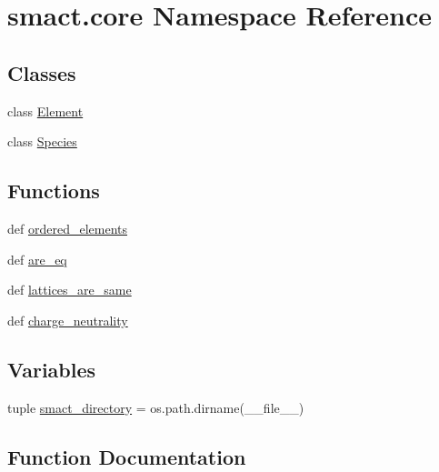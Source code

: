 \hypertarget{namespacesmact_1_1core}{}\section{smact.\+core Namespace Reference}
\label{namespacesmact_1_1core}
\subsection*{Classes}
\begin{DoxyCompactItemize}
\item 
class \hyperlink{classsmact_1_1core_1_1_element}{Element}
\item 
class \hyperlink{classsmact_1_1core_1_1_species}{Species}
\end{DoxyCompactItemize}
\subsection*{Functions}
\begin{DoxyCompactItemize}
\item 
def \hyperlink{namespacesmact_1_1core_a3e8b27f822e17a79e50b1399825564ff}{ordered\+\_\+elements}
\item 
def \hyperlink{namespacesmact_1_1core_a5a32e4b9b50d3db379ede8d7b8b1081a}{are\+\_\+eq}
\item 
def \hyperlink{namespacesmact_1_1core_abd4953dbc9b28e11861b3b63092ec4fa}{lattices\+\_\+are\+\_\+same}
\item 
def \hyperlink{namespacesmact_1_1core_a523386aa44322d0a2670672b4535bab3}{charge\+\_\+neutrality}
\end{DoxyCompactItemize}
\subsection*{Variables}
\begin{DoxyCompactItemize}
\item 
tuple \hyperlink{namespacesmact_1_1core_aaa14f990a82d90eaab5ad3667e72453e}{smact\+\_\+directory} = os.\+path.\+dirname(\+\_\+\+\_\+file\+\_\+\+\_\+)
\end{DoxyCompactItemize}


\subsection{Function Documentation}
\hypertarget{namespacesmact_1_1core_a5a32e4b9b50d3db379ede8d7b8b1081a}{}
